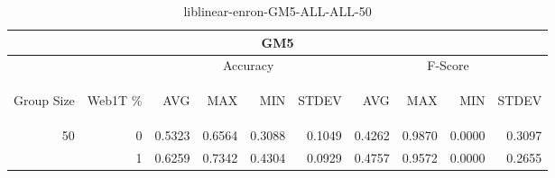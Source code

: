\begin{center}
\begin{table}[htbp] 
 \begin{center}
\begin{tabular}{ | r | r | r | r | r | r | r | r | r | r |}
\hline
\multicolumn{10}{|c|}{GM5}\\
\hline
 & & \multicolumn{4}{|c|}{Accuracy} & \multicolumn{4}{|c|}{F-Score}\\ \cline{3-10}
\begin{sideways}Group Size\end{sideways} & \begin{sideways}Web1T \%\end{sideways} & \begin{sideways}AVG\end{sideways} & \begin{sideways}MAX\end{sideways} & \begin{sideways}MIN\end{sideways} & \begin{sideways}STDEV\end{sideways} & \begin{sideways}AVG\end{sideways} & \begin{sideways}MAX\end{sideways} & \begin{sideways}MIN\end{sideways} & \begin{sideways}STDEV\end{sideways}\\
\hline
\multirow{1}{*}{50}
 & 0 & 0.5323 & 0.6564 & 0.3088 & 0.1049 & 0.4262 & 0.9870 & 0.0000 & 0.3097\\ \cline{2-10}
 & 1 & 0.6259 & 0.7342 & 0.4304 & 0.0929 & 0.4757 & 0.9572 & 0.0000 & 0.2655\\ \cline{2-10}
\hline
\end{tabular}
\caption{liblinear-enron-GM5-ALL-ALL-50}
\label{table:liblinear-enron-GM5-ALL-ALL-50}
\end{center}
 \end{table}
\end{center}

